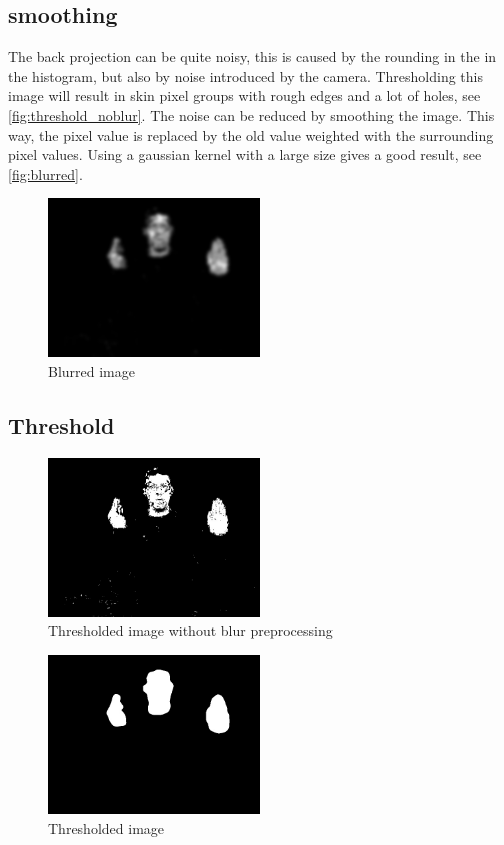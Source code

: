 \subsection*{smoothing}
The back projection can be quite noisy, this is caused by the rounding in the in the histogram, but also by noise introduced by the camera. Thresholding this image will result in skin pixel groups with rough edges and a lot of holes, see \autoref{fig:threshold_noblur}. The noise can be reduced by smoothing the image. This way, the pixel value is replaced by the old value weighted with the surrounding pixel values. Using a gaussian kernel with a large size gives a good result, see \autoref{fig:blurred}.

\begin{figure}[htbp]
    \center{}
    \includegraphics[width=0.5\textwidth]{figures/pipeline/blurred.jpg}
	\caption{Blurred image}
	\label{fig:blurred}
\end{figure}


\subsection*{Threshold}

\begin{figure}[htbp]
    \center{}
 \includegraphics[width=0.5\textwidth]{figures/pipeline/thresholded_noblur.jpg}
	\caption{Thresholded image without blur preprocessing}
	\label{fig:threshold_noblur}
\end{figure}

\begin{figure}[htbp]
    \center{}
    \includegraphics[width=0.5\textwidth]{figures/pipeline/thresholded.jpg}
	\caption{Thresholded image}
	\label{fig:threshold}
\end{figure}



